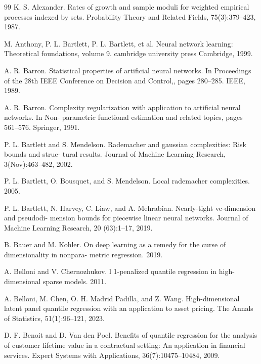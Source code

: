 \documentclass[twoside,11pt]{article}
\begin{document}
\begin{thebibliography}{99}
 K. S. Alexander. Rates of growth and sample moduli for weighted empirical processes indexed by sets. Probability Theory and Related Fields, 75(3):379--423, 1987.

 M. Anthony, P. L. Bartlett, P. L. Bartlett, et al. Neural network learning: Theoretical foundations, volume 9. cambridge university press Cambridge, 1999.

 A. R. Barron. Statistical properties of artificial neural networks. In Proceedings of the 28th IEEE Conference on Decision and Control,, pages 280--285. IEEE, 1989.

 A. R. Barron. Complexity regularization with application to artificial neural networks. In Non- parametric functional estimation and related topics, pages 561--576. Springer, 1991.

 P. L. Bartlett and S. Mendelson. Rademacher and gaussian complexities: Risk bounds and struc- tural results. Journal of Machine Learning Research, 3(Nov):463--482, 2002.

 P. L. Bartlett, O. Bousquet, and S. Mendelson. Local rademacher complexities. 2005.

 P. L. Bartlett, N. Harvey, C. Liaw, and A. Mehrabian. Nearly-tight vc-dimension and pseudodi- mension bounds for piecewise linear neural networks. Journal of Machine Learning Research, 20 (63):1--17, 2019.

 B. Bauer and M. Kohler. On deep learning as a remedy for the curse of dimensionality in nonpara- metric regression. 2019.

 A. Belloni and V. Chernozhukov. l 1-penalized quantile regression in high-dimensional sparse models. 2011.

 A. Belloni, M. Chen, O. H. Madrid Padilla, and Z. Wang. High-dimensional latent panel quantile regression with an application to asset pricing. The Annals of Statistics, 51(1):96--121, 2023.

 D. F. Benoit and D. Van den Poel. Benefits of quantile regression for the analysis of customer lifetime value in a contractual setting: An application in financial services. Expert Systems with Applications, 36(7):10475--10484, 2009.


\end{thebibliography}
\end{document}
